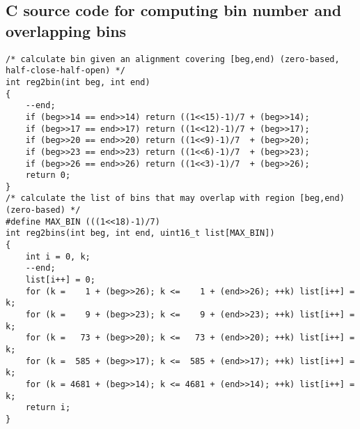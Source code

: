 \documentclass[10pt]{article}
\begin{document}
\subsection{C source code for computing bin number and overlapping bins}\label{sec:code}

{\small
\begin{verbatim}
/* calculate bin given an alignment covering [beg,end) (zero-based, half-close-half-open) */
int reg2bin(int beg, int end)
{
    --end;
    if (beg>>14 == end>>14) return ((1<<15)-1)/7 + (beg>>14);
    if (beg>>17 == end>>17) return ((1<<12)-1)/7 + (beg>>17);
    if (beg>>20 == end>>20) return ((1<<9)-1)/7  + (beg>>20);
    if (beg>>23 == end>>23) return ((1<<6)-1)/7  + (beg>>23);
    if (beg>>26 == end>>26) return ((1<<3)-1)/7  + (beg>>26);
    return 0;
}
/* calculate the list of bins that may overlap with region [beg,end) (zero-based) */
#define MAX_BIN (((1<<18)-1)/7)
int reg2bins(int beg, int end, uint16_t list[MAX_BIN])
{
    int i = 0, k;
    --end;
    list[i++] = 0;
    for (k =    1 + (beg>>26); k <=    1 + (end>>26); ++k) list[i++] = k;
    for (k =    9 + (beg>>23); k <=    9 + (end>>23); ++k) list[i++] = k;
    for (k =   73 + (beg>>20); k <=   73 + (end>>20); ++k) list[i++] = k;
    for (k =  585 + (beg>>17); k <=  585 + (end>>17); ++k) list[i++] = k;
    for (k = 4681 + (beg>>14); k <= 4681 + (end>>14); ++k) list[i++] = k;
    return i;
}
\end{verbatim}
}
\end{document}
